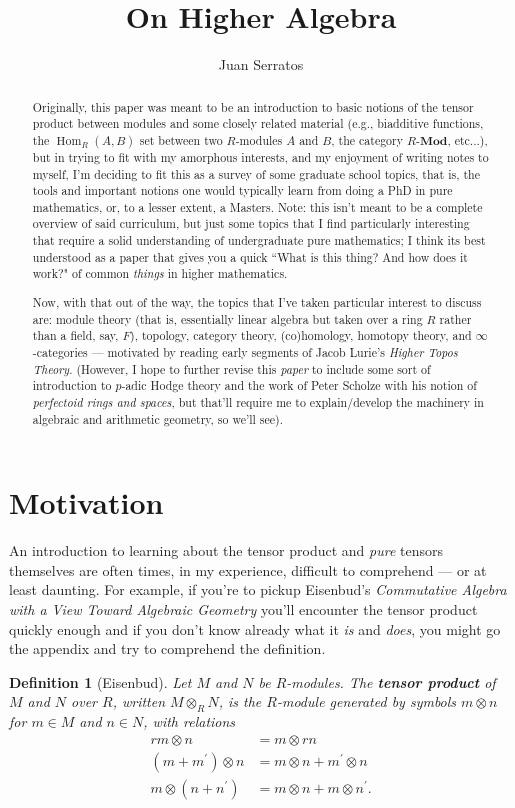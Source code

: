 \documentclass[12pt,reqno]{amsart}
\title{On Higher Algebra}
\author{Juan Serratos}
\theoremstyle{plain}
\newtheorem{defi}{Definition}
\DeclareMathOperator{\Hom}{Hom}
\begin{document}
\begin{abstract}
Originally, this paper was meant to be an introduction to basic notions of the tensor product between modules and some closely related material (e.g., biadditive functions, the $\Hom_R (A, B)$ set between two $R$-modules $A$ and $B$,  the category $R$-$\mathbf{Mod}$, etc...), but in trying to fit with my amorphous interests,  and my enjoyment of writing notes to myself, I'm deciding to fit this as a survey of some graduate school topics, that is, the tools and important notions one would typically learn from doing a PhD in pure mathematics, or, to a lesser extent, a Masters. Note: this isn't meant to be a complete overview of said curriculum, but just some topics that I find particularly interesting that require a solid understanding of undergraduate pure mathematics; I think its best understood as a paper that gives you a quick ``What is this thing? And how does it work?" of common \textit{things} in higher mathematics. 

Now, with that out of the way, the topics that I've taken particular interest to discuss are: module theory (that is, essentially linear algebra but taken over a ring $R$ rather than a field, say, $F$), topology, category theory,  (co)homology, homotopy theory, and $\infty$-categories — motivated by reading early segments of Jacob Lurie's \textit{Higher Topos Theory}.  (However, I hope to further revise this \textit{paper} to include some sort of introduction to $p$-adic Hodge theory and the work of Peter Scholze with his notion of \textit{perfectoid rings and spaces}, but that'll require me to explain/develop the machinery in algebraic and arithmetic geometry, so we'll see). 
\end{abstract}
\maketitle
\tableofcontents
\newpage
\section{Motivation}

An introduction to learning about the tensor product and \textit{pure} tensors themselves are often times, in my experience, difficult to comprehend — or at least daunting. For example, if you're to pickup Eisenbud's \textit{Commutative Algebra with a View Toward Algebraic Geometry} you'll encounter the tensor product quickly enough and if you don't know already what it \textit{is} and \textit{does}, you might go the appendix and try to comprehend the definition. 
\begin{defi}[Eisenbud] Let $M$ and $N$ be $R$-modules. The \textbf{tensor product} of $M$ and $N$ over $R$, written $M \otimes_R N$, is the $R$-module generated by symbols $m \otimes n$ for $m \in M$ and $n \in N$, with relations 
\begin{align*}
rm \otimes n &= m \otimes rn \\
(m + m^{\prime}) \otimes n &= m \otimes n + m^{\prime} \otimes n  \\
m \otimes (n + n^{\prime}) &= m \otimes n + m \otimes n^{\prime}.
\end{align*}
\end{defi} 
\end{document}
